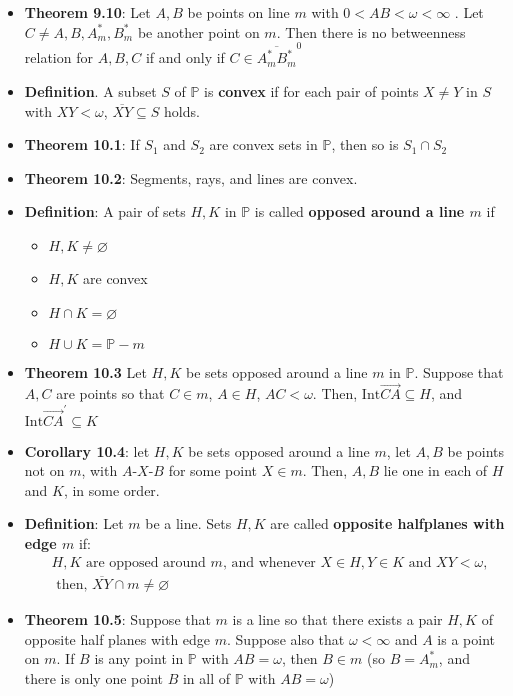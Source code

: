 \documentclass{report}
\begin{document}
\begin{itemize}
        \item \textbf{Theorem 9.10}: Let $A,B$ be points on line $m$ with $0 < AB < \omega < \infty$ . Let $C \ne A,B,A_{m}^{*}, B_{m}^{*} $ be another point on $m$. Then there is no betweenness relation for $A,B,C$ if and only if $C \in \overline{A_{m}^{*}B_{m}^{*}}^{0}$
        \item \textbf{Definition}. A subset $S$ of $\mathbb{P}$ is \textbf{convex} if for each pair of points $X \ne Y$ in $S$ with $XY < \omega$, $\overline{XY} \subseteq S$ holds.
        \item \textbf{Theorem 10.1}: If $S_{1}$ and $S_{2}$ are convex sets in $\mathbb{P}$, then so is $S_{1} \cap S_{2}$
        \item \textbf{Theorem 10.2}: Segments, rays, and lines are convex.
        \item \textbf{Definition}: A pair of sets $H,K$ in $\mathbb{P}$ is called \textbf{opposed around a line $m$} if 
            \begin{itemize}
                \item $H,K \ne \varnothing $
                \item $H,K$ are convex
                \item $H \cap K = \varnothing $
                \item $H \cup K = \mathbb{P} - m$
            \end{itemize}
        \item \textbf{Theorem 10.3} Let $H,K$ be sets opposed around a line $m$ in $\mathbb{P}$. Suppose that $A,C$ are points so that $C \in m$, $A \in H$, $AC < \omega$. Then, $\text{Int}\overrightarrow{CA} \subseteq H$, and $\text{Int}\overrightarrow{CA}^{\prime} \subseteq K $
        \item \textbf{Corollary 10.4}: let $H,K$ be sets opposed around a line $m$, let $A,B$ be points not on $m$, with $ A\text{-}X\text{-}B$ for some point $X \in m$. Then, $A,B$ lie one in each of $H$ and $K$, in some order.
        \item \textbf{Definition}: Let $m$ be a line. Sets $H,K$ are called \textbf{opposite halfplanes with edge $m$} if:
            \bigbreak \noindent 
            \begin{align*}
                &H,K \text{ are opposed around $m$, and whenever } X \in H, Y \in K \text{ and } XY < \omega, \\ &\text{ then, } \overline{XY} \cap m \ne \varnothing
            \end{align*}
        \item \textbf{Theorem 10.5}: Suppose that $m$ is a line  so that there exists a pair $H,K$ of opposite half planes with edge $m$. Suppose also that $\omega < \infty$ and $A$ is a point on $m$. If $B$ is any point in $\mathbb{P}$ with $AB = \omega$, then $B \in m$ (so $B = A_{m}^{*}$, and there is only one point $B$ in all of $\mathbb{P}$ with $AB = \omega$)

\end{itemize}
\end{document}
